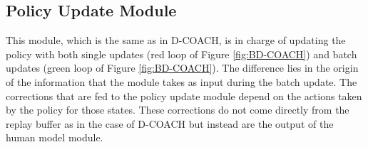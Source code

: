 \subsection*{Policy Update Module}
This module, which is the same as in D-COACH, is in charge of updating the policy with both single updates (red loop of Figure \ref{fig:BD-COACH}) and batch updates (green loop of Figure \ref{fig:BD-COACH}). The difference lies in the origin of the information that the module takes as input during the batch update. The corrections that are fed to the policy update module depend on the actions taken by the policy for those states. These corrections do not come directly from the replay buffer as in the case of D-COACH but instead are the output of the human model module.








